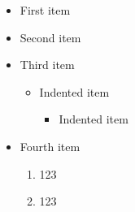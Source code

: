 \documentclass[10pt]{article}
\begin{document}
\begin{itemize}
\item First item
\item Second item
\item Third item
\begin{itemize}
\item Indented item
\begin{itemize}
\item Indented item
\end{itemize}
\end{itemize}
\item Fourth item
\begin{enumerate}
\item 123
\item 123
\end{enumerate}
\end{itemize}
\end{document}
